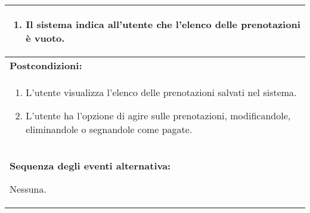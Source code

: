 \documentclass{article}
\begin{document}
\begin{table}[t]
\begin{tabular}{|p{\linewidth}|}
\begin{enumerate}
\begin{enumerate}
                \item Il sistema indica all'utente che l'elenco delle prenotazioni è vuoto.
            \end{enumerate}
        \end{enumerate} \\
        \hline
        \cellcolor{gray!20}
        \textbf{Postcondizioni:} \\
        \cellcolor{gray!20}
        \begin{minipage}{\linewidth}
            \begin{enumerate}[noitemsep]
                \item L'utente visualizza l'elenco delle prenotazioni salvati nel sistema.
                \item L'utente ha l'opzione di agire sulle prenotazioni, modificandole, eliminandole o segnandole come pagate.
            \end{enumerate}  
        \end{minipage}
        \vspace{0pt} \\
        \hline
        \textbf{Sequenza degli eventi alternativa:}
        
        Nessuna. \\
        \hline
    \end{tabular}
\end{table}
\end{document}
